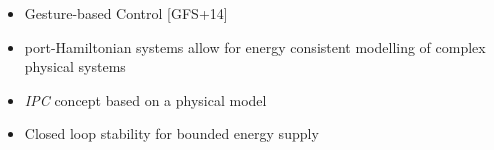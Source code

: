 \documentclass[student]{ITRslides}
\begin{document}
\begin{frame}
\begin{itemize}
		\item Gesture-based Control \nocite{Gioioso_2014}{\tiny [GFS+14]} 
		\end{itemize}
		
			\begin{block}{}
			\begin{itemize}
			\item port-Hamiltonian systems allow for energy consistent modelling of complex physical systems
			\item \emph{IPC} concept based on a physical model

			\item Closed loop stability for bounded energy supply%
			\end{itemize}
			\end{block}
\end{frame}
\end{document}
